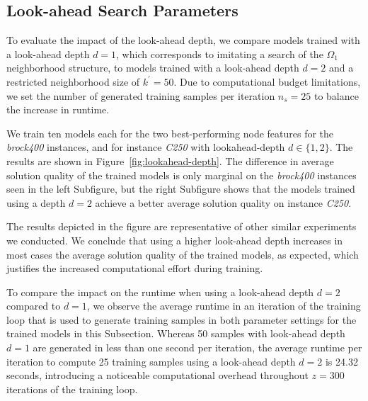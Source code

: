 \documentclass[draft,final]{vutinfth} %
\begin{document}
\subsection{Look-ahead Search Parameters}
To evaluate the impact of the look-ahead depth, we compare models trained with a look-ahead depth $d=1$, which corresponds to imitating a search of the $\Omega_1$ neighborhood structure, to models trained with a look-ahead depth $d=2$ and a restricted neighborhood size of $k^\prime = 50$. Due to computational budget limitations, we set the number of generated training samples per iteration $n_s = 25$ to balance the increase in runtime. 

We train ten models each for the two best-performing node features for the \emph{brock400} instances, and for instance \emph{C250} with lookahead-depth $d \in \{1,2\}$. 
The results are shown in Figure~\ref{fig:lookahead-depth}. 
The difference in average solution quality of the trained models is only marginal on the \emph{brock400} instances seen in the left Subfigure, but the right Subfigure shows that the models trained using a depth $d=2$ achieve a better average solution quality on instance \emph{C250}. 

The results depicted in the figure are representative of other similar experiments we conducted. We conclude that using a higher look-ahead depth increases in most cases the average solution quality of the trained models, as expected, which justifies the increased computational effort during training. 

To compare the impact on the runtime when using a look-ahead depth $d=2$ compared to $d=1$, we observe the average runtime in an iteration of the training loop that is used to generate training samples in both parameter settings for the trained models in this Subsection. Whereas 50 samples with look-ahead depth $d=1$ are generated in less than one second per iteration, the average runtime per iteration to compute 25 training samples using a look-ahead depth $d=2$ is 24.32 seconds, introducing a noticeable computational overhead throughout $z=300$ iterations of the training loop. 
\end{document}
